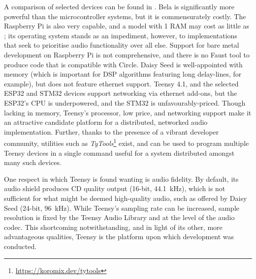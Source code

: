 A comparison of selected devices can be found in
.
Bela is significantly more powerful than the microcontroller systems, but it is
commensurately costly.
The Raspberry Pi is also very capable, and a model with \qty{1}{\gigabyte} RAM
may cost as little as ;
its operating system stands as an impediment, however, to implementations that
seek to prioritise audio functionality over all else.
Support for bare metal development on Raspberry Pi is not comprehensive, and
there is no Faust tool to produce code that is compatible with Circle.
Daisy Seed is well-appointed with memory (which is important for DSP algorithms
featuring long delay-lines, for example), but does not feature ethernet support.
Teensy 4.1, and the selected ESP32 and STM32 devices support networking via
ethernet add-ons, but the ESP32's CPU is underpowered, and the STM32 is
unfavourably-priced.
Though lacking in memory, Teensy's processor, low price, and networking support
make it an attractive candidate platform for a distributed, networked audio
implementation.
Further, thanks to the presence of a vibrant developer community, utilities such
as \textit{TyTools}\footnote{\url{https://koromix.dev/tytools}} exist, and can
be used to program multiple Teensy devices in a single command \textemdash{}
useful for a system distributed amongst many such devices.

One respect in which Teensy is found wanting is audio fidelity.
By default, its audio shield produces CD quality output (16-bit,
\qty{44.1}{\kHz}), which is not sufficient for what might be deemed high-quality
audio, such as offered by Daisy Seed (24-bit, \qty{96}{\kHz}).
While Teensy's sampling rate can be increased, sample resolution is fixed by
the Teensy Audio Library and at the level of the audio codec.
This shortcoming notwithstanding, and in light of its other, more advantageous
qualities, Teensy is the platform upon which development was conducted.
